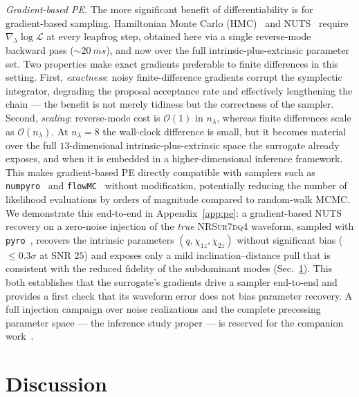 \documentclass[aps,prd,twocolumn,superscriptaddress,longbibliography]{revtex4-2}
\newcommand{\NRSur}{\textsc{NRSur7dq4}}
\begin{document}
\textit{Gradient-based PE.}
The more significant benefit of differentiability is for
gradient-based sampling.
Hamiltonian Monte Carlo (HMC)~\cite{Duane:1987,Neal:2011} and
NUTS~\cite{Hoffman:2014} require
$\nabla_\lambda \log \mathcal{L}$ at every leapfrog step,
obtained here via a single reverse-mode backward pass ($\sim\!\SI{20}{ms}$),
and now over the full intrinsic-plus-extrinsic parameter set.
Two properties make exact gradients preferable to finite differences in
this setting.
First, \emph{exactness}: noisy finite-difference gradients corrupt the
symplectic integrator, degrading the proposal acceptance rate and
effectively lengthening the chain --- the benefit is not merely tidiness
but the correctness of the sampler.
Second, \emph{scaling}: reverse-mode cost is $\mathcal{O}(1)$ in
$n_\lambda$, whereas finite differences scale as $\mathcal{O}(n_\lambda)$.
At $n_\lambda = 8$ the wall-clock difference is small, but it becomes
material over the full $13$-dimensional intrinsic-plus-extrinsic space the
surrogate already exposes, and when it is embedded in a higher-dimensional
inference framework.
This makes gradient-based PE directly compatible with
samplers such as \texttt{numpyro}~\cite{Phan:2019} and
\texttt{flowMC}~\cite{Wong:2022}
without modification, potentially reducing the number of
likelihood evaluations by orders of magnitude compared to
random-walk MCMC.
We demonstrate this end-to-end in Appendix~\ref{app:pe}: a gradient-based
NUTS recovery on a zero-noise injection of the \emph{true} \NRSur{} waveform,
sampled with \texttt{pyro}~\cite{Bingham:2019}, recovers the intrinsic
parameters $(q,\chi_{1z},\chi_{2z})$ without significant bias
($\leq\!0.3\sigma$ at SNR $25$) and exposes only a mild inclination--distance
pull that is consistent with the reduced fidelity of the subdominant modes
(Sec.~\ref{sec:discussion}). This both establishes that the surrogate's
gradients drive a sampler end-to-end and provides a first check that its
waveform error does not bias parameter recovery. A full injection campaign
over noise realizations and the complete precessing parameter space ---
the inference study proper --- is reserved for the companion
work~\cite{Modrekiladze:GW_AI:2024}.

\section{Discussion}
\label{sec:discussion}
\end{document}
